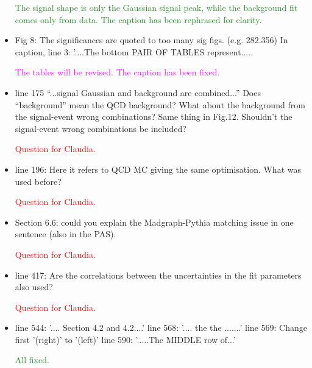 \documentclass[paper=a4, fontsize=11pt]{scrartcl}
\begin{document}
\begin{itemize}
\textcolor{ForestGreen}{The signal shape is only the Gaussian signal peak, while the background
fit comes only from data. The caption has been rephrased for clarity.}\\


\item Fig 8: The significances are quoted to too many sig figs. (e.g. 282.356) In caption, line 3: '....The bottom PAIR OF TABLES represent.....

\textcolor{magenta}{The tables will be revised. The caption has been fixed.}\\

\item line 175 ``...signal Gaussian and background are combined...'' Does ``background'' mean the QCD background? What about the background from the signal-event wrong combinations? Same thing in Fig.12. Shouldn't the signal-event wrong combinations be included?

\textcolor{red}{Question for Claudia.}\\

\item line 196: Here it refers to QCD MC giving the same optimisation. What was used before?

\textcolor{red}{Question for Claudia.}\\

\item Section 6.6: could you explain the Madgraph-Pythia matching issue in one sentence (also in the PAS).

\textcolor{red}{Question for Claudia.}\\

\item line 417: Are the correlations between the uncertainties in the fit parameters also used?

\textcolor{red}{Question for Claudia.}\\

\item line 544: '.... Section 4.2 and 4.2....' 
line 568: '.... the the .......' 
line 569: Change first '(right)' to '(left)' 
line 590: '.....The MIDDLE row of...'

\textcolor{ForestGreen}{All fixed.}\\

\end{itemize}
\end{document}
